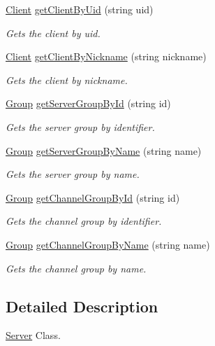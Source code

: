 \begin{DoxyCompactItemize}
\hyperlink{class_ts3_api_1_1_client}{Client} \hyperlink{class_ts3_api_1_1_server_aed494922b927ed93491f798c42d4cc37}{get\+Client\+By\+Uid} (string uid)
\begin{DoxyCompactList}\small\item\em Gets the client by uid. \end{DoxyCompactList}\item 
\hyperlink{class_ts3_api_1_1_client}{Client} \hyperlink{class_ts3_api_1_1_server_a235d7e5596be98d9dc91fa07b75edcb9}{get\+Client\+By\+Nickname} (string nickname)
\begin{DoxyCompactList}\small\item\em Gets the client by nickname. \end{DoxyCompactList}\item 
\hyperlink{class_ts3_api_1_1_group}{Group} \hyperlink{class_ts3_api_1_1_server_a51c2e4e6f36a523dd49be6bbbfb79809}{get\+Server\+Group\+By\+Id} (string id)
\begin{DoxyCompactList}\small\item\em Gets the server group by identifier. \end{DoxyCompactList}\item 
\hyperlink{class_ts3_api_1_1_group}{Group} \hyperlink{class_ts3_api_1_1_server_ace36f786f8af7ef68a430d77f028a17f}{get\+Server\+Group\+By\+Name} (string name)
\begin{DoxyCompactList}\small\item\em Gets the server group by name. \end{DoxyCompactList}\item 
\hyperlink{class_ts3_api_1_1_group}{Group} \hyperlink{class_ts3_api_1_1_server_a2bfcde843c19e6db0ffa6ca1fc87b53c}{get\+Channel\+Group\+By\+Id} (string id)
\begin{DoxyCompactList}\small\item\em Gets the channel group by identifier. \end{DoxyCompactList}\item 
\hyperlink{class_ts3_api_1_1_group}{Group} \hyperlink{class_ts3_api_1_1_server_a16863c6d4f1d86878a3a3e929d7d5ad4}{get\+Channel\+Group\+By\+Name} (string name)
\begin{DoxyCompactList}\small\item\em Gets the channel group by name. \end{DoxyCompactList}\end{DoxyCompactItemize}


\subsection{Detailed Description}
\hyperlink{class_ts3_api_1_1_server}{Server} Class. 


